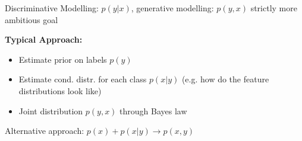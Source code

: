 Discriminative Modelling: $p(y|x)$, generative modelling: $p(y,x)$ strictly more ambitious goal

\textbf{Typical Approach:}
\begin{itemize}
    \item Estimate prior on labels $p(y)$
    \item Estimate cond. distr. for each class $p(x|y)$ (e.g. how do the feature distributions look like)
    \item Joint distribution $p(y,x)$ through Bayes law 
\end{itemize}
Alternative approach: $p(x) + p(x|y) \rightarrow p(x,y)$




